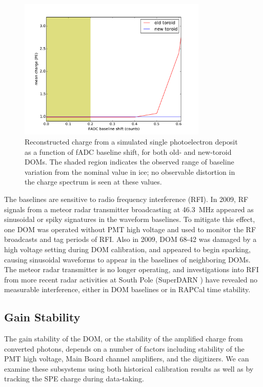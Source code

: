 \begin{figure}[!h]
 \centering
 \includegraphics[width=0.8\textwidth]{graphics/dom/reliability/charge_fadcshift.pdf}
 \caption{Reconstructed charge from a simulated single photoelectron
   deposit as a function of fADC baseline shift, for both old- and
   new-toroid DOMs. The shaded region indicates the observed range of 
   baseline variation from the nominal value in ice; no observable
   distortion in the charge spectrum is seen at these values.}
 \label{fig:charge_fadcshift}
\end{figure}

The baselines are sensitive to radio frequency interference (RFI). In
2009, RF signals from a meteor radar transmitter broadcasting at 46.3~MHz
appeared as sinusoidal or spiky signatures in the waveform
baselines.  To mitigate this effect, one DOM was operated without PMT high
voltage and used to monitor the RF broadcasts and tag periods of RFI.  Also
in 2009, DOM 68-42 was damaged by a high voltage setting during DOM
calibration, and appeared to begin sparking, causing sinusoidal waveforms
to appear in the baselines of neighboring DOMs. The meteor radar
transmitter is no longer operating, and investigations into RFI
from more recent radar activities at South Pole (SuperDARN
\cite{superdarn}) have revealed no measurable interference, either in DOM
baselines or in RAPCal time stability. 

\subsection{\label{sec:gain_stability}Gain Stability}

The gain stability of the DOM, or the stability of the amplified charge
from converted photons, depends on a number of factors including stability
of the PMT high voltage, Main Board channel amplifiers, and the digitizers.
We can examine these subsystems using both historical calibration results
as well as by tracking the SPE charge during data-taking.

